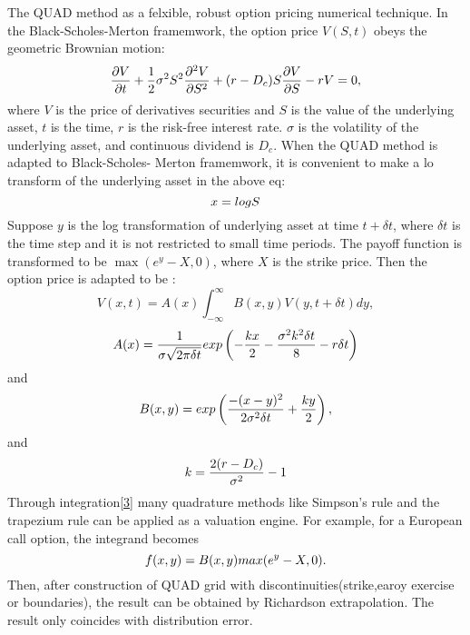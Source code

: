 \documentclass{article}
\numberwithin{equation}{section}
\begin{document}
 The QUAD method as a felxible, robust option pricing numerical technique. In the 
 Black-Scholes-Merton framemwork, the option price $V(S,t)$ obeys the geometric Brownian motion:
 \begin{equation}\notag
     \frac{\partial V}{\partial t}+ \frac{1}{2}\sigma^2 S^2 \frac{\partial^2 V}{\partial S^2}+(r-D_c)S \frac{\partial V}{\partial S} - rV =0,
 \end{equation}
 where $V$ is the price of derivatives securities and $S$ is the value of the underlying asset, $t$ is the time, $r$ is the risk-free interest
 rate. $\sigma$ is the volatility of the underlying asset, and continuous dividend is $D_c$. When the QUAD method is adapted to Black-Scholes-
 Merton framemwork, it is convenient to make a lo transform of the underlying asset in the above eq:
 \begin{equation}\notag
     x=log S
 \end{equation}
 Suppose $y$ is the log transformation of underlying asset at time $t+\delta t$, where $\delta t$ is the time step and it is not restricted to 
 small time periods. The payoff function is transformed to be $\max(e^y-X,0)$, where $X$ is the strike price. Then the option price is adapted
 to be :
 \begin{equation}\label{3}
     V(x,t)=A(x)\int_{-\infty}^{\infty}B(x,y)V(y,t+\delta t)dy,
 \end{equation}
 \begin{equation}\notag
     A(x)=\frac{1}{\sigma \sqrt{2\pi \delta t}}exp\left(-\frac{kx}{2}-\frac{\sigma^2 k^2 \delta t}{8}-r\delta t\right)
 \end{equation}
 and
 \begin{equation}\notag
     B(x,y)=exp\left(\frac{-(x-y)^2}{2\sigma^2 \delta t}+\frac{ky}{2}\right),
 \end{equation}
 and 
 \begin{equation}\notag
     k=\frac{2(r-D_c)}{\sigma^2} -1
 \end{equation}
 Through integration\eqref{3} many quadrature methods like Simpson's rule and the trapezium rule can be applied 
 as a valuation engine. For example, for a European call option, the integrand becomes 
 \begin{equation}\notag
     f(x,y)=B(x,y)max(e^y-X,0).
 \end{equation} 
 Then, after construction of QUAD grid with discontinuities(strike,earoy exercise or boundaries), the result can be obtained
 by Richardson extrapolation. The result only coincides with distribution error.
\end{document}
